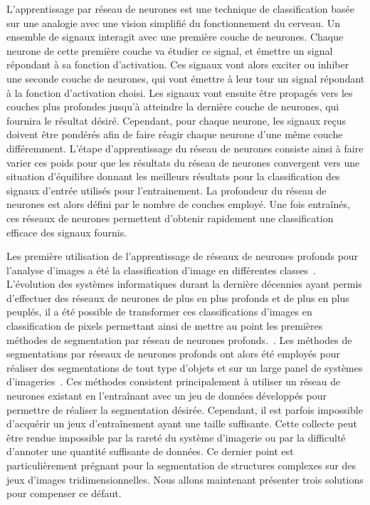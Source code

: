 \documentclass[\main/main.tex]{subfiles}
\begin{document}
%
L'apprentissage par réseau de neurones est une technique de classification basée sur une analogie avec une vision simplifié du fonctionnement du cerveau.
%
Un ensemble de signaux interagit avec une première couche de neurones.
%
Chaque neurone de cette première couche va étudier ce signal, et émettre un signal répondant à sa fonction d'activation.
%
Ces signaux vont alors exciter ou inhiber une seconde couche de neurones, qui vont émettre à leur tour un signal répondant à la fonction d'activation choisi.
%
Les signaux vont ensuite être propagés vers les couches plus profondes jusqu'à atteindre la dernière couche de neurones, qui fournira le résultat désiré.
%
Cependant, pour chaque neurone, les signaux reçus doivent être pondérés afin de faire réagir chaque neurone d'une même couche différemment.
%
L'étape d'apprentissage du réseau de neurones consiste ainsi à faire varier ces poids pour que les résultats du réseau de neurones convergent vers une situation d'équilibre donnant les meilleurs résultats pour la classification des signaux d'entrée utilisés pour l'entrainement.
%
La profondeur du réseau de neurones est alors défini par le nombre de couches employé.
%
Une fois entraînés, ces réseaux de neurones permettent d'obtenir rapidement une classification efficace des signaux fournis.

%
Les première utilisation de l'apprentissage de réseaux de neurones profonds pour l'analyse d'images a été la classification d'image en différentes classes~\cite{lecun_1989,krizhevsky_2012,Simonyan_2014}.
%
L'évolution des systèmes informatiques durant la dernière décennies ayant permis d'effectuer des réseaux de neurones de plus en plus profonds et de plus en plus peuplés, il a été possible de transformer ces classifications d'images en classification de pixels permettant ainsi de mettre au point les premières méthodes de segmentation par réseau de neurones profonds.~\cite{ronneberger_2015,milletari_2016}.
%
Les méthodes de segmentations par réseaux de neurones profonds ont alors été employés pour réaliser des segmentations de tout type d'objets et sur un large panel de systèmes d'imageries~\cite{zhao_2019,xie_2020,xu_2020,zhang_2020,khan_2020,zhang_2019a}.
%
Ces méthodes consistent principalement à utiliser un réseau de neurones existant
en l'entraînant avec un jeu de données développés pour permettre de réaliser la segmentation désirée.
%
Cependant, il est parfois impossible d'acquérir un jeux d'entraînement ayant une taille suffisante.
%
Cette collecte peut être rendue impossible par la rareté du système d'imagerie ou par la difficulté d'annoter une quantité suffisante de données.
%
Ce dernier point est particulièrement prégnant pour la segmentation de structures complexes sur des jeux d'images tridimensionnelles.
%
Nous allons maintenant présenter trois solutions pour compenser ce défaut.
\end{document}
